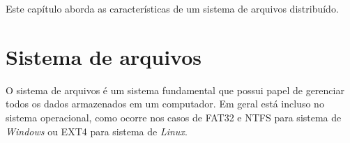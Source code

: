 	Este capítulo aborda as características de um sistema de arquivos distribuído. 
	

	\section{Sistema de arquivos}
	
	O sistema de arquivos é um sistema fundamental que possui papel de gerenciar todos os dados armazenados em um computador.
	Em geral está incluso no sistema operacional, como ocorre nos casos de FAT32 e NTFS para sistema de \textit{Windows} ou EXT4 para sistema de \textit{Linux}.
	
	
	
